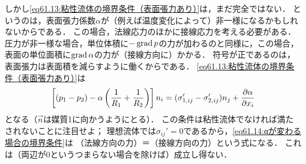 しかし\eqref{eq61.13:粘性流体の境界条件（表面張力あり）}は，まだ完全ではない．
というのは，表面張力係数$\alpha$が（例えば温度変化によって）非一様になるかもしれないからである．
この場合，法線応力のほかに接線応力を考える必要がある．
圧力が非一様な場合，単位体積に$-\operatorname{grad} p$の力が加わるのと同様に，この場合，
表面の単位面積に$\operatorname{grad} \alpha$の力が（接線方向に）かかる．
符号が正であるのは，表面張力は表面積を減らすように働くからである．
\eqref{eq61.13:粘性流体の境界条件（表面張力あり）}は
\begin{equation}\label{eq61.14:αが変わる場合の境界条件}
    \left[ (p_1-p_2) - \alpha \left( \frac{1}{R_1} + \frac{1}{R_2} \right) \right] n_i 
    = ( \sigma_{1,ij}' - \sigma_{2,ij}' ) n_j +  \pdv{\alpha}{x_i}
\end{equation}
となる（$\vec{n}$は媒質1に向かうようにとる）．
この条件は粘性流体でなければ満たされないことに注目せよ；
理想流体では$\sigma_{ij}'=0$であるから，\eqref{eq61.14:αが変わる場合の境界条件}は
（法線方向の力）＝（接線方向の力）という式になる．
これは（両辺が0というつまらない場合を除けば）成立し得ない．







\BackToTheToc